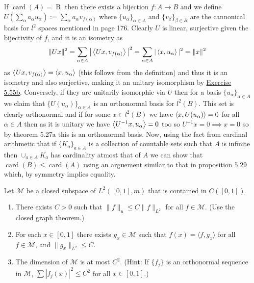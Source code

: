 \documentclass[12pt,a4paper]{article}
\begin{document}
\begin{solution}
    If $\operatorname{card}(A)=\operatorname{B}$ then there exists a bijection $f:A\to B$ and we define $U(\sum_\alpha a_\alpha u_\alpha):=\sum_\alpha a_\alpha v_{f(\alpha)}$ where $\{u_\alpha\}_{\alpha\in A}$ and $\{v_\beta\}_{\beta\in B}$ are the cannonical basis for $l^2$ spaces mentioned in page 176. 
    Clearly $U$ is linear, surjective given the bijectivity of $f$, and it is an isometry as 
    \[
        \|Ux\|^2=\sum_{\alpha\in A}\big|\left\langle Ux,v_{f(\alpha)}\right\rangle\big|^2=\sum_{\alpha\in A}|\left\langle x,u_\alpha\right\rangle|^2=\|x\|^2
    \]
    as $\left\langle Ux,v_{f(\alpha)}\right\rangle=\left\langle x,u_\alpha\right\rangle$ (this follows from the definition) and thus it is an isometry and also surjective, making it an unitary isomorphism by \hyperref[prob:5-55]{Exercise 5.55b}. 
    Conversely, if they are unitarily isomorphic via $U$ then for a basis $\{u_\alpha\}_{\alpha\in A}$ we claim that $\{U(u_\alpha)\}_{\alpha\in A}$ is an orthonormal basis for $l^2(B).$ 
    This set is clearly orthonormal and if for some $x\in l^2(B)$ we have $\left\langle x,U(u_\alpha)\right\rangle=0$ for all $\alpha\in A$ then as it is unitary we have $\left\langle U^{-1}x,u_\alpha\right\rangle=0$ too so $U^{-1}x=0\implies x=0$ so by theorem 5.27a this is an orthonormal basis. 
    Now, using the fact from cardinal arithmetic that if $\{K_a\}_{a\in A}$ is a collection of countable sets such that $A$ is infinite then $\cup_{a\in A}K_a$ has cardinality atmost that of $A$ we can show that $\operatorname{card}(B)\leq\operatorname{card}(A)$ using an arguement similar to that in proposition 5.29 which, by symmetry implies equality. 
\end{solution}
\begin{problem}\label{prob:5-66}
Let $\mathcal{M}$ be a closed subspace of $L^2([0,1],m)$ that is contained in $C([0,1])$.
\begin{enumerate}[label=\alph*.]
\item There exists $C > 0$ such that $\|f\|_u \le C\|f\|_{L^2}$ for all $f \in \mathcal{M}$. (Use the closed graph theorem.)
\item For each $x \in [0,1]$ there exists $g_x \in \mathcal{M}$ such that $f(x) = \langle f,g_x \rangle$ for all $f \in \mathcal{M}$, and $\|g_x\|_{L^2} \le C$.
\item The dimension of $\mathcal{M}$ is at most $C^2$. (Hint: If $\{f_j\}$ is an orthonormal sequence in $\mathcal{M}$, $\sum |f_j(x)|^2 \le C^2$ for all $x \in [0,1]$.)
\end{enumerate}
\end{problem}
\end{document}

